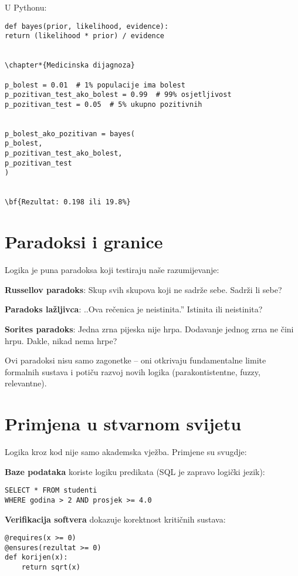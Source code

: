 U Pythonu:
\begin{verbatim}
def bayes(prior, likelihood, evidence):
return (likelihood * prior) / evidence


\chapter*{Medicinska dijagnoza}

p_bolest = 0.01  # 1% populacije ima bolest
p_pozitivan_test_ako_bolest = 0.99  # 99% osjetljivost
p_pozitivan_test = 0.05  # 5% ukupno pozitivnih


p_bolest_ako_pozitivan = bayes(
p_bolest,
p_pozitivan_test_ako_bolest,
p_pozitivan_test
)


\bf{Rezultat: 0.198 ili 19.8%}

\end{verbatim}


\section{Paradoksi i granice}


Logika je puna paradoksa koji testiraju naše razumijevanje:


\textbf{Russellov paradoks}: Skup svih skupova koji ne sadrže sebe. Sadrži li sebe?


\textbf{Paradoks lažljivca}: ..Ova rečenica je neistinita.'' Istinita ili neistinita?


\textbf{Sorites paradoks}: Jedna zrna pijeska nije hrpa. Dodavanje jednog zrna ne čini hrpu. Dakle, nikad nema hrpe?


Ovi paradoksi nisu samo zagonetke -- oni otkrivaju fundamentalne limite formalnih sustava i potiču razvoj novih logika (parakontistentne, fuzzy, relevantne).


\section{Primjena u stvarnom svijetu}


Logika kroz kod nije samo akademska vježba. Primjene su svugdje:


\textbf{Baze podataka} koriste logiku predikata (SQL je zapravo logički jezik):
\begin{verbatim}
SELECT * FROM studenti
WHERE godina > 2 AND prosjek >= 4.0
\end{verbatim}


\textbf{Verifikacija softvera} dokazuje korektnost kritičnih sustava:
\begin{verbatim}
@requires(x >= 0)
@ensures(rezultat >= 0)
def korijen(x):
    return sqrt(x)
\end{verbatim}



